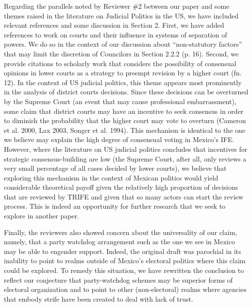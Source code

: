 \documentclass[12pt]{article}
\begin{document}
Regarding the parallels noted by Reviewer \#2 between our paper and
some themes raised in the literature on Judicial Politics in the US,
we have included relevant references and some discussion in Section
2.  First, we have added references to work on courts and their
influence in systems of separation of powers.  We do so in the
context of our discussion about ``non-statutory factors'' that may
limit the discretion of Councilors in Section 2.2.2 (p. 16). Second,
we provide citations to scholarly work that considers the
possibility of consensual opinions in lower courts as a strategy to
preempt revision by a higher court (fn. 12).  In the context of US
judicial politics, this theme appears most prominently in the
analysis of district courts decisions.  Since these decisions can be
overturned by the Supreme Court (an event that may cause
professional embarrassment), some claim that district courts may
have an incentive to seek consensus in order to diminish the
probability that the higher court may vote to overturn (Cameron et
al. 2000, Lax 2003, Songer et al. 1994).  This mechanism is
identical to the one we believe may explain the high degree of
consensual voting in Mexico's IFE.  However, where the literature on
US judicial politics concludes that incentives for strategic
consensus-building are low (the Supreme Court, after all, only
reviews a very small percentage of all cases decided by lower
courts), we believe that exploring this mechanism in the context of
Mexican politics would yield considerable theoretical payoff given
the relatively high proportion of decisions that are reviewed by
TRIFE and given that so many actors can start the review process.
This is indeed an opportunity for further research that we seek to
explore in another paper.

Finally, the reviewers also showed concern about the universality of
our claim, namely, that a party watchdog arrangement such as the one
we see in Mexico may be able to engender support.  Indeed, the
original draft was parochial in its inability to point to realms
outside of Mexico's electoral politics where this claim could be
explored.  To remedy this situation, we have rewritten the
conclusion to reflect our conjecture that party-watchdog schemes may
be superior forms of electoral organization and to point to other
(non-electoral) realms where agencies that embody strife have been
created to deal with lack of trust.
\end{document}
